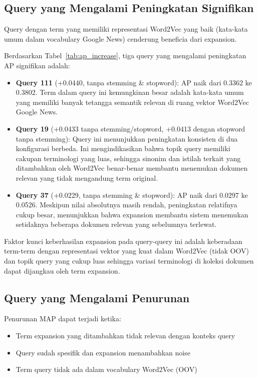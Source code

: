 \documentclass[12pt,a4paper]{report}
\begin{document}
\subsection{Query yang Mengalami Peningkatan Signifikan}
Query dengan term yang memiliki representasi Word2Vec yang baik (kata-kata umum dalam vocabulary Google News) cenderung beneficia dari expansion.

Berdasarkan Tabel~\ref{tab:ap_increase}, tiga query yang mengalami peningkatan AP signifikan adalah:
\begin{itemize}
    \item \textbf{Query 111} (+0.0440, tanpa stemming \& stopword): AP naik dari 0.3362 ke 0.3802. Term dalam query ini kemungkinan besar adalah kata-kata umum yang memiliki banyak tetangga semantik relevan di ruang vektor Word2Vec Google News.
    \item \textbf{Query 19} (+0.0433 tanpa stemming/stopword, +0.0413 dengan stopword tanpa stemming): Query ini menunjukkan peningkatan konsisten di dua konfigurasi berbeda. Ini mengindikasikan bahwa topik query memiliki cakupan terminologi yang luas, sehingga sinonim dan istilah terkait yang ditambahkan oleh Word2Vec benar-benar membantu menemukan dokumen relevan yang tidak mengandung term original.
    \item \textbf{Query 37} (+0.0229, tanpa stemming \& stopword): AP naik dari 0.0297 ke 0.0526. Meskipun nilai absolutnya masih rendah, peningkatan relatifnya cukup besar, menunjukkan bahwa expansion membantu sistem menemukan setidaknya beberapa dokumen relevan yang sebelumnya terlewat.
\end{itemize}
Faktor kunci keberhasilan expansion pada query-query ini adalah keberadaan term-term dengan representasi vektor yang kuat dalam Word2Vec (tidak OOV) dan topik query yang cukup luas sehingga variasi terminologi di koleksi dokumen dapat dijangkau oleh term expansion.

\subsection{Query yang Mengalami Penurunan}
Penurunan MAP dapat terjadi ketika:
\begin{itemize}
    \item Term expansion yang ditambahkan tidak relevan dengan konteks query
    \item Query sudah spesifik dan expansion menambahkan noise
    \item Term query tidak ada dalam vocabulary Word2Vec (OOV)
\end{itemize}
\end{document}

